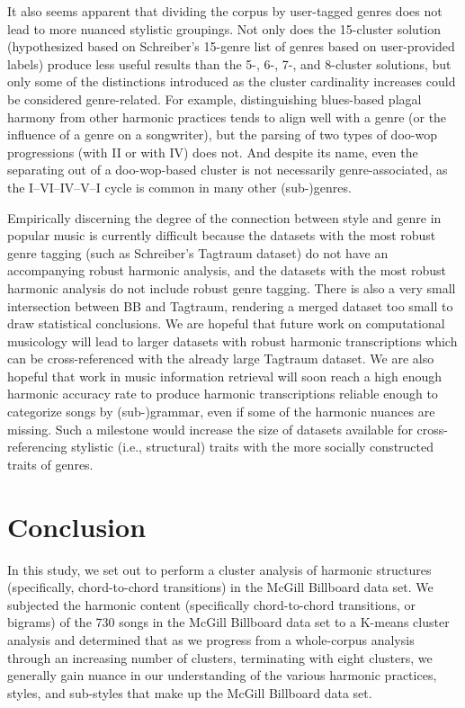 It also seems apparent that dividing the corpus by user-tagged genres does not lead to more nuanced stylistic groupings. Not only does the 15-cluster solution (hypothesized based on Schreiber's 15-genre list of genres based on user-provided labels) produce less useful results than the 5-, 6-, 7-, and 8-cluster solutions, but only some of the distinctions introduced as the cluster cardinality increases could be considered genre-related. For example, distinguishing blues-based plagal harmony from other harmonic practices tends to align well with a genre (or the influence of a genre on a songwriter), but the parsing of two types of doo-wop progressions (with II or with IV) does not. And despite its name, even the separating out of a doo-wop-based cluster is not necessarily genre-associated, as the I–VI–IV–V–I cycle is common in many other (sub-)genres.

Empirically discerning the degree of the connection between style and genre in popular music is currently difficult because the datasets with the most robust genre tagging (such as Schreiber's Tagtraum dataset) do not have an accompanying robust harmonic analysis, and the datasets with the most robust harmonic analysis do not include robust genre tagging. There is also a very small intersection between BB and Tagtraum, rendering a merged dataset too small to draw statistical conclusions. We are hopeful that future work on computational musicology will lead to larger datasets with robust harmonic transcriptions which can be cross-referenced with the already large Tagtraum dataset. We are also hopeful that work in music information retrieval will soon reach a high enough harmonic accuracy rate to produce harmonic transcriptions reliable enough to categorize songs by (sub-)grammar, even if some of the harmonic nuances are missing. Such a milestone would increase the size of datasets available for cross-referencing stylistic (i.e., structural) traits with the more socially constructed traits of genres.

\chapter{Conclusion}
\label{conclusion}

In this study, we set out to perform a cluster analysis of harmonic structures (specifically, chord-to-chord transitions) in the McGill Billboard data set. We subjected the harmonic content (specifically chord-to-chord transitions, or bigrams) of the 730 songs in the McGill Billboard data set to a K-means cluster analysis and determined that as we progress from a whole-corpus analysis through an increasing number of clusters, terminating with eight clusters, we generally gain nuance in our understanding of the various harmonic practices, styles, and sub-styles that make up the McGill Billboard data set.

